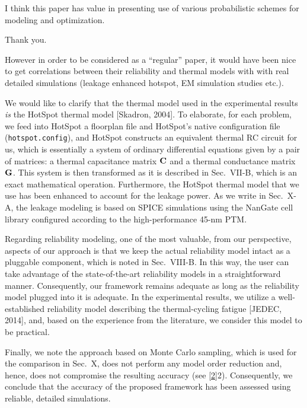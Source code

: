 \begin{reviewer}
I think this paper has value in presenting use of various probabilistic schemes
for modeling and optimization.
\end{reviewer}

\begin{authors}
  Thank you.
\end{authors}

\begin{reviewer}
However in order to be considered as a ``regular'' paper, it would have been
nice to get correlations between their reliability and thermal models with with
real detailed simulations (leakage enhanced hotspot, EM simulation studies
etc.).
\end{reviewer}

\begin{authors}
We would like to clarify that the thermal model used in the experimental results
\emph{is} the HotSpot thermal model [Skadron, 2004]. To elaborate, for each
problem, we feed into HotSpot a floorplan file and HotSpot's native
configuration file (\texttt{hotspot.config}), and HotSpot constructs an
equivalent thermal RC circuit for us, which is essentially a system of ordinary
differential equations given by a pair of matrices: a thermal capacitance matrix
$\mathbf{C}$ and a thermal conductance matrix $\mathbf{G}$. This system is then
transformed as it is described in Sec.~VII-B, which is an exact mathematical
operation. Furthermore, the HotSpot thermal model that we use has been enhanced
to account for the leakage power. As we write in Sec.~X-A, the leakage modeling
is based on SPICE simulations using the NanGate cell library configured
according to the high-performance 45-nm PTM.

Regarding reliability modeling, one of the most valuable, from our perspective,
aspects of our approach is that we keep the actual reliability model intact as a
pluggable component, which is noted in Sec.~VIII-B. In this way, the user can
take advantage of the state-of-the-art reliability models in a straightforward
manner. Consequently, our framework remains adequate as long as the reliability
model plugged into it is adequate. In the experimental results, we utilize a
well-established reliability model describing the thermal-cycling fatigue
[JEDEC, 2014], and, based on the experience from the literature, we consider
this model to be practical.

Finally, we note the approach based on Monte Carlo sampling, which is used for
the comparison in Sec.~X, does not perform any model order reduction and, hence,
does not compromise the resulting accuracy (see \cref{2}{2}). Consequently, we
conclude that the accuracy of the proposed framework has been assessed using
reliable, detailed simulations.

\begin{actions}
\end{actions}
\end{authors}

